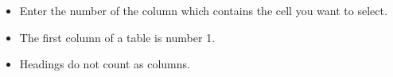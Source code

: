    \begin{itemize}
\item Enter the number of the column which contains the cell you want to select.
\item The first column of a table is number 1.
\item Headings do not count as columns. 
\end{itemize} 